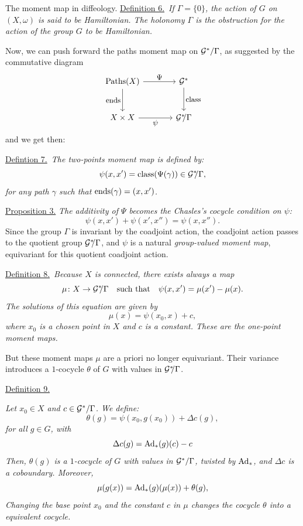 \begin{Article}{The moment map in diffeology.}{}
  \uline{Definition 6.}~{\itshape If $\Gamma = \{0\}$,
  the action of $G$ on $(X,\omega)$ is said to be \emph{Hamiltonian}.
  The holonomy $\Gamma$ is the obstruction for the action of the group $G$ to be Hamiltonian.}
  
  Now,
  we can push forward the paths moment map on $\mathcal{G}^*/\Gamma$,
  as suggested by the commutative diagram
  $$%
    \begin{tikzcd}[column sep=large, row sep=large, every label/.append style = {font = \small}]
    \Paths(X) \arrow[d, swap, "\Ends"] \arrow[r, "\Psi"] &  \cG^* \arrow[d, "\Class"] \\
    X \times X \arrow[r, swap, "\psi"] & \cG^*\!\!/\Gamma
    \end{tikzcd}
    $$%
  and we get then:
  
  \uline{Defintion 7.}~{\itshape The \emph{two-points moment map} is defined by:
  $$%
    \psi(x,x') = \Class(\Psi(\gamma)) \in \cG^*\!\!/\Gamma,
    $$%
  for any path $\gamma$ such that $\operatorname{ends}(\gamma) = (x,x')$.
  }
  
  \uline{Proposition 3.} {\itshape The additivity of $\Psi$ becomes the Chasles's cocycle condition on $\psi$:}
  $$%
    \psi(x,x') + \psi(x',x'') = \psi(x,x'').
    $$%
  Since the group $\Gamma$ is invariant by the coadjoint action,
  the coadjoint action passes to the quotient group $\mathcal{G}^*\!\!/\Gamma$,
  and $\psi$ is a natural \emph{group-valued moment map},
  equivariant for this quotient coadjoint action.
  
  \uline{Definition 8.}~{\itshape Because $X$ is connected,
  there exists always a map
  $$%
    \mu \colon X \to \cG^*\!\!/\Gamma
    \quad \mbox{such that} \quad
    \psi(x,x') = \mu(x') - \mu(x).
    $$%
  The solutions of this equation are given by
  $$%
    \mu(x)=\psi(x_0,x) + c,
    $$%
  where $x_0$ is a chosen point in $X$ and $c$ is a constant.
  These are the \emph{one-point moment maps}.
  }
  
  But these moment maps $\mu$ are a priori no longer equivariant.
  Their variance introduces a $1$-cocycle $\theta$ of $G$ with values in $\mathcal{G}^*\!\!/\Gamma$.
  
  \uline{Definition 9.}~{\itshape Let $x_0 \in X$ and $c \in \mathcal{G}^*/\Gamma$.
  We define:
  $$%
    \theta(g) = \psi(x_0,g(x_0)) + \Delta c(g),
    $$%
  for all $g \in G$,
  with
  $$%
    \Delta c(g) = \Ad_*(g)(c) - c
    $$%
  Then,
  $\theta(g)$ is a $1$-cocycle of $G$ with values in $\mathcal{G}^*/\Gamma$,
  twisted by $\mathrm{Ad}_*$,
  and $\Delta c$ is a coboundary.
  Moreover,
  $$%
    \mu(g(x))= \Ad_*(g)(\mu(x)) + \theta(g),
    $$%
  Changing the base point $x_0$ and the constant $c$ in $\mu$ changes the cocycle $\theta$ into a  equivalent cocycle.
  
}
\end{Article}
